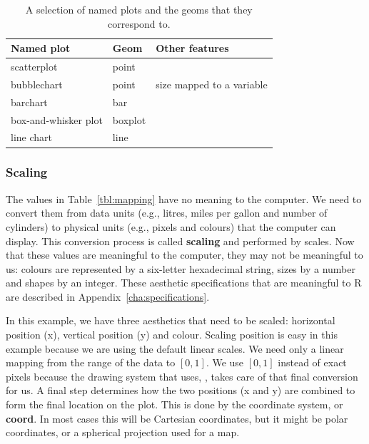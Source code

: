 \begin{table}
  \begin{center}
  \begin{tabular}{lll}
    \toprule 
    Named plot & Geom & Other features \\
    \midrule
    scatterplot & point &  \\
    bubblechart & point & size mapped to a variable \\ 
    barchart & bar &  \\
    box-and-whisker plot & boxplot &  \\
    line chart & line &  \\     
    \bottomrule
  \end{tabular}
  \end{center}
  \caption{A selection of named plots and the geoms that they correspond to.}
  \label{tbl:named-plots}
\end{table}

% 


\subsubsection{Scaling} 

The values in Table~\ref{tbl:mapping} have no meaning to the computer. We need to convert them from data units (e.g., litres, miles per gallon and number of cylinders) to physical units (e.g., pixels and colours) that the computer can display. This conversion process is called {\bf scaling} and performed by scales. Now that these values are meaningful to the computer, they may not be meaningful to us: colours are represented by a six-letter hexadecimal string, sizes by a number and shapes by an integer.  These aesthetic specifications that are meaningful to R are described in Appendix~\ref{cha:specifications}.

In this example, we have three aesthetics that need to be scaled: horizontal position (x), vertical position (y) and colour. Scaling position is easy in this example because we are using the default linear scales. We need only a linear mapping from the range of the data to $[0, 1]$. We use $[0, 1]$ instead of exact pixels because the drawing system that \ggplot uses, , takes care of that final conversion for us. A final step determines how the two positions (x and y) are combined to form the final location on the plot. This is done by the coordinate system, or {\bf coord}. In most cases this will be Cartesian coordinates, but it might be polar coordinates, or a spherical projection used for a map.

